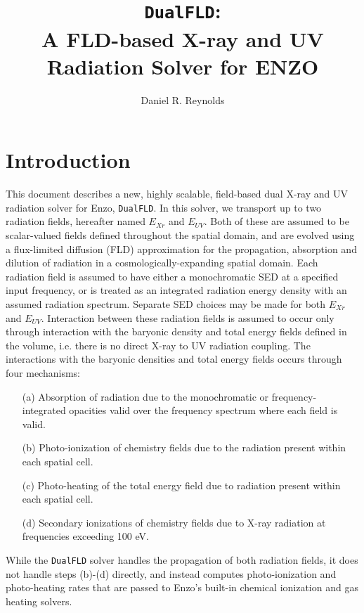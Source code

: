 \documentclass[letterpaper,10pt]{article}
\author{Daniel R. Reynolds}
\title{{\tt DualFLD}: \\
A FLD-based X-ray and UV Radiation Solver for ENZO}
\renewcommand{\(}{\left(}
\renewcommand{\)}{\right)}
\begin{document}
\maketitle

\section{Introduction}
\label{sec:intro}

This document describes a new, highly scalable,
field-based dual X-ray and UV radiation solver for Enzo, 
{\tt DualFLD}.  In this solver, we transport up to two radiation
fields, hereafter named $E_{Xr}$ and $E_{UV}$.  Both of these are
assumed to be scalar-valued fields defined throughout the spatial
domain, and are evolved using a flux-limited diffusion (FLD)
approximation for the propagation, absorption and dilution of
radiation in a cosmologically-expanding spatial domain.  Each
radiation field is assumed to have either a monochromatic SED at a
specified input frequency, or is treated as an integrated radiation
energy density with an assumed radiation spectrum.  Separate SED
choices may be made for both $E_{Xr}$ and $E_{UV}$.  Interaction
between these radiation fields is assumed to occur only through
interaction with the baryonic density and total energy fields defined
in the volume, i.e. there is no direct X-ray to UV radiation coupling.
The interactions with the baryonic densities and total energy fields
occurs through four mechanisms:
\begin{itemize}
\item[(a)] Absorption of radiation due to the monochromatic or 
  frequency-integrated opacities valid over the frequency spectrum
  where each field is valid.
\item[(b)] Photo-ionization of chemistry fields due to the radiation 
  present within each spatial cell.
\item[(c)] Photo-heating of the total energy field due to radiation
  present within each spatial cell.
\item[(d)] Secondary ionizations of chemistry fields due to X-ray
  radiation at frequencies exceeding 100 eV.
\end{itemize}
While the {\tt DualFLD} solver handles the propagation of both
radiation fields, it does not handle steps (b)-(d) directly, and
instead computes photo-ionization and photo-heating rates that are
passed to Enzo's built-in chemical ionization and gas heating
solvers.
\end{document}
